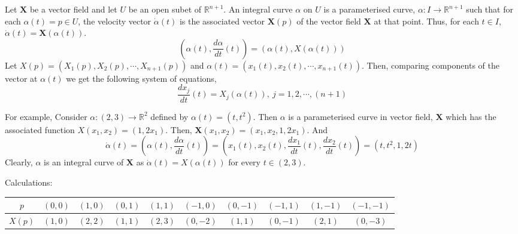 \begin{definition}
	Let $\mathbf{X}$ be a vector field and let $U$ be an open subet of $\mathbb{R}^{n+1}$.
	An integral curve $\alpha$ on $U$ is a parameterised curve, $\alpha : I \to \mathbb{R}^{n+1}$ such that for each $\alpha(t) = p \in U$, the velocity vector $\dot{\alpha}(t)$ is the associated vector $\mathbf{X}(p)$ of the vector field $\mathbf{X}$ at that point. Thus, for each $t \in I$, $\dot{\alpha}(t) = \mathbf{X}(\alpha(t))$.
	\begin{equation}
		\left(\alpha(t),\frac{d \alpha}{dt}(t)\right) = \left(\alpha(t),X(\alpha(t))\right)
	\end{equation}
	Let $X(p) = \left(X_1(p),X_2(p),\cdots,X_{n+1}(p)\right)$ and $\alpha(t) = \left(x_1(t),x_2(t),\cdots,x_{n+1}(t)\right)$. Then, comparing components of the vector at $\alpha(t)$ we get the following system of equations,
	\begin{equation}
		\frac{d x_j}{dt}(t) = X_j(\alpha(t)),\ j = 1,2,\cdots,(n+1)
	\end{equation}
\end{definition}

For example, Consider $\alpha : (2,3) \to \mathbb{R}^2$ defined by $\alpha(t) = (t,t^2)$. Then $\alpha$ is a parameterised curve in vector field, $\mathbf{X}$ which has the associated function $X(x_1,x_2) = (1,2x_1)$. Then, $\mathbf{X}(x_1,x_2) = (x_1,x_2,1,2x_1)$. And
\[ \dot{\alpha}(t) = \left( \alpha(t),\frac{d\alpha}{dt}(t) \right) = \left( x_1(t),x_2(t),\frac{dx_1}{dt}(t), \frac{dx_2}{dt}(t) \right) = (t,t^2,1,2t) \]
Clearly, $\alpha$ is an integral curve of $\mathbf{X}$ as $\dot{\alpha}(t) = X(\alpha(t))$ for every $t \in (2,3)$.

Calculations:\\
\begin{tabular}{|c|c|c|c|c|c|c|c|c|c|} \hline
	$p$    & $(0,0)$ & $(1,0)$ & $(0,1)$ & $(1,1)$ & $(-1,0)$ & $(0,-1)$ & $(-1,1)$ & $(1,-1)$ & $(-1,-1)$ \\ \hline
	$X(p)$ & $(1,0)$ & $(2,2)$ & $(1,1)$ & $(2,3)$ & $(0,-2)$ & $(1, 1)$ & $(0,-1)$ & $(2, 1)$ & $( 0,-3)$ \\ \hline
\end{tabular}

